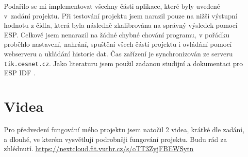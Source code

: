 \documentclass[a4paper, 11pt]{article}
\begin{document}
	Podařilo se mi implementovat všechny části aplikace, které byly uvedené v~zadání projektu. Při testování projektu jsem narazil pouze na nižší výstupní hodnotu z čidla, která byla následně zkalibrována na správný výsledek pomocí ESP. Celkově jsem nenarazil na žádné chybné chování programu, v pořádku proběhlo nastavení, nahrání, spuštění všech částí projektu i ovládání pomocí webserveru a ukládání historie dat. Čas zařízení je synchronizován ze serveru \texttt{tik.cesnet.cz}. Jako literaturu jsem použil zadanou studijní \cite{cidloMan} a dokumentaci pro ESP IDF \cite{espMan}. 

\section{Videa}
Pro předvedení fungování mého projektu jsem natočil 2 videa, krátké dle zadání, a dlouhé, ve kterém vysvětluji podrobněji fungování projektu. Budu rád za zhlédnutí. \url{https://nextcloud.fit.vutbr.cz/s/oTT3ZyjFBEWSytn}
	\clearpage
	
	
\end{document}
